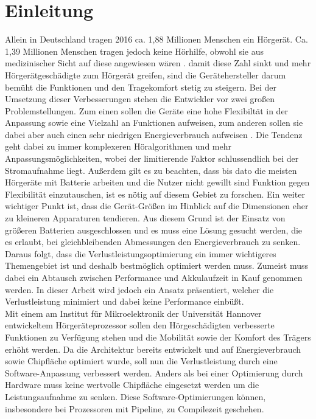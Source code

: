 
\thispagestyle{empty}
%
\chapter{Einleitung}
\label{chap:introduction}
Allein in Deutschland tragen 2016 ca. 1,88 Millionen Menschen ein Hörgerät. Ca. 1,39 Millionen Menschen tragen jedoch keine Hörhilfe, obwohl sie aus medizinischer Sicht auf diese angewiesen wären \cite{statistica}. damit diese Zahl sinkt und mehr Hörgerätgeschädigte zum Hörgerät greifen, sind die Gerätehersteller darum bemüht die Funktionen und den Tragekomfort stetig zu steigern.
Bei der Umsetzung dieser Verbesserungen stehen die Entwickler vor zwei großen Problemstellungen. Zum einen sollen die Geräte eine hohe Flexibiltät in der Anpassung sowie eine Vielzahl an Funktionen aufweisen, zum anderen sollen sie dabei aber auch einen sehr niedrigen Energieverbrauch aufweisen \cite{lee2007low}. Die Tendenz geht dabei zu immer komplexeren Höralgorithmen und mehr Anpassungsmöglichkeiten, wobei der limitierende Faktor schlussendlich bei der Stromaufnahme liegt.
Außerdem gilt es zu beachten, dass bis dato die meisten Hörgeräte mit Batterie arbeiten und die Nutzer nicht gewillt sind Funktion gegen Flexibilität einzutauschen, ist es nötig auf diesem Gebiet zu forschen. Ein weiter wichtiger Punkt ist, dass die Gerät-Größen im Hinblick auf die Dimensionen eher zu kleineren Apparaturen tendieren. Aus diesem Grund ist der Einsatz von größeren Batterien ausgeschlossen und es muss eine Lösung gesucht werden, die es erlaubt, bei gleichbleibenden Abmessungen den Energieverbrauch zu senken. Daraus folgt, dass die Verlustleistungsoptimierung ein immer wichtigeres Themengebiet ist und deshalb bestmöglich optimiert werden muss. 
Zumeist muss dabei ein Abtausch zwischen Performance und Akkulaufzeit in Kauf genommen werden. In dieser Arbeit wird jedoch ein Ansatz präsentiert, welcher die Verlustleistung minimiert und dabei keine Performance einbüßt.\\
Mit einem am Institut für Mikroelektronik der Universität Hannover entwickeltem Hörgeräteprozessor sollen den Hörgeschädigten verbesserte Funktionen zu Verfügung stehen und die Mobilität sowie der Komfort des Trägers erhöht werden. Da die Architektur bereits entwickelt und auf Energieverbrauch sowie Chipfläche optimiert wurde, soll nun die Verlustleistung durch eine Software-Anpassung verbessert werden. Anders als bei einer Optimierung durch Hardware muss keine wertvolle Chipfläche eingesetzt werden um die Leistungsaufnahme zu senken. Diese Software-Optimierungen können, insbesondere bei Prozessoren mit Pipeline, zu Compilezeit geschehen.\\

